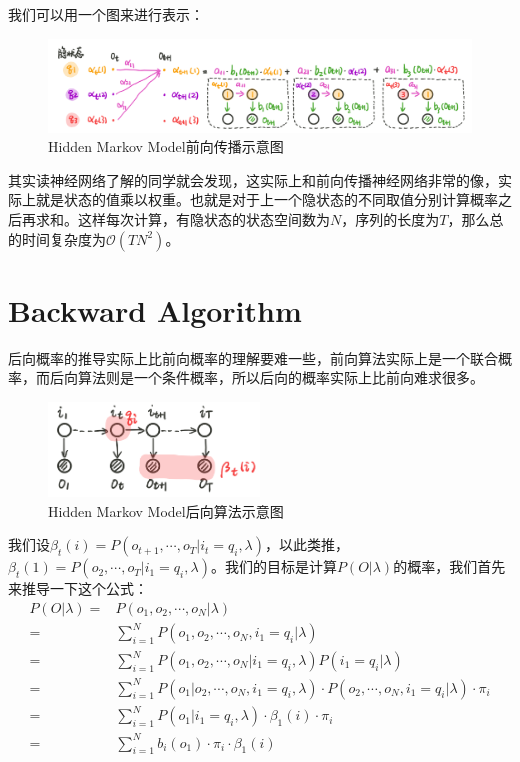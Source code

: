 \documentclass[a4paper]{article}
\begin{document}
我们可以用一个图来进行表示：
\begin{figure}[H]
    \centering
    \includegraphics[width=1\textwidth]{微信图片_20200108115145.png}
    \caption{Hidden Markov Model前向传播示意图}
    \label{fig:my_label_1}
\end{figure}

其实读神经网络了解的同学就会发现，这实际上和前向传播神经网络非常的像，实际上就是状态的值乘以权重。也就是对于上一个隐状态的不同取值分别计算概率之后再求和。这样每次计算，有隐状态的状态空间数为$N$，序列的长度为$T$，那么总的时间复杂度为$\mathcal{O}(TN^2)$。

\section{Backward Algorithm}
后向概率的推导实际上比前向概率的理解要难一些，前向算法实际上是一个联合概率，而后向算法则是一个条件概率，所以后向的概率实际上比前向难求很多。
\begin{figure}[H]
    \centering
    \includegraphics[width=0.5\textwidth]{微信图片_20200108150401.png}
    \caption{Hidden Markov Model后向算法示意图}
    \label{fig:my_label_1}
\end{figure}

我们设$\beta_t(i)= P(o_{t+1},\cdots,o_T|i_t = q_i,\lambda)$，以此类推，$\beta_t(1)= P(o_{2},\cdots,o_T|i_1 = q_i,\lambda)$。我们的目标是计算$P(O|\lambda)$的概率，我们首先来推导一下这个公式：
\begin{equation}
    \begin{split}
        P(O|\lambda) 
        = & P(o_1,o_2,\cdots,o_N|\lambda) \\
        = & \sum_{i=1}^N P(o_1,o_2,\cdots,o_N,i_1=q_i|\lambda) \\
        = & \sum_{i=1}^N P(o_1,o_2,\cdots,o_N|i_1=q_i, \lambda)P(i_1=q_i|\lambda) \\
        = & \sum_{i=1}^N P(o_1| o_2,\cdots,o_N, i_1=q_i, \lambda)\cdot P(o_2,\cdots,o_N, i_1=q_i | \lambda) \cdot \pi_i \\
        = & \sum_{i=1}^N P(o_1| i_1=q_i,\lambda) \cdot \beta_1(i) \cdot \pi_i \\
        = & \sum_{i=1}^N b_i(o_1) \cdot \pi_i \cdot \beta_1(i) \\
    \end{split}
\end{equation}
\end{document}
